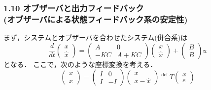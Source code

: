 \documentclass[10pt]{beamer}
\begin{document}
\begin{frame}[t]
\frametitle{1.10 オブザーバと出力フィードバック \\
(オブザーバによる状態フィードバック系の安定性)}
まず，システムとオブザーバを合わせたシステム(併合系)は
\begin{equation}
 \frac{d}{dt}
  \left(\begin{array}{c}
         x \\
   \hat{x}
  \end{array}\right)
  =
  \left(\begin{array}{cc}
         A & 0 \\
   -KC & A+KC
  \end{array}\right)
  \left(\begin{array}{c}
         x \\
   \hat{x}
  \end{array}\right)
  +
  \left(\begin{array}{c}
         B \\
   B
  \end{array}\right)
  u
  
\end{equation}
となる．
ここで，次のような座標変換を考える．
\begin{equation}
 \left(\begin{array}{c}
         x \\
   \hat{x}
       \end{array}\right)
 =
 \left(\begin{array}{cc}
        I & 0 \\
  I & -I
       \end{array}\right)
 \left(\begin{array}{c}
         x \\
   x - \hat{x}
       \end{array}\right)
 \stackrel{\text{def}}{=} T
 \left(\begin{array}{c}
         x \\
   e
       \end{array}\right)
\end{equation}
\end{frame}
\end{document}
